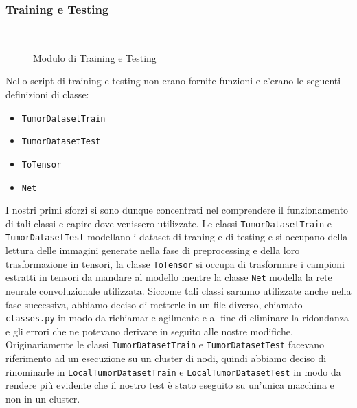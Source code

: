 \subsubsection{Training e Testing} ~\newline
\begin{figure}[hbpt!]
		\centering
		
  		\caption{Modulo di Training e Testing}
        \label{fig:CNN_module}
\end{figure}
Nello script di training e testing non erano fornite funzioni e c'erano le seguenti definizioni di classe:
\begin{itemize}
	\item \texttt{TumorDatasetTrain}
	\item \texttt{TumorDatasetTest}
	\item \texttt{ToTensor}
	\item \texttt{Net}
\end{itemize}
I nostri primi sforzi si sono dunque concentrati nel comprendere il funzionamento di tali classi
e capire dove venissero utilizzate.
Le classi \texttt{TumorDatasetTrain} e \texttt{TumorDatasetTest} modellano i dataset di traning e di testing 
e si occupano della lettura delle immagini generate nella fase di preprocessing e della loro trasformazione in
tensori, la classe \texttt{ToTensor} si occupa di trasformare i campioni estratti in tensori da mandare al modello
mentre la classe \texttt{Net} modella la rete neurale convoluzionale utilizzata. 
Siccome tali classi saranno utilizzate anche nella fase successiva, abbiamo deciso di metterle in un file
diverso, chiamato \texttt{classes.py} in modo da richiamarle agilmente e al fine di eliminare la ridondanza e gli 
errori che ne potevano derivare in seguito alle nostre modifiche. 
Originariamente le classi \texttt{TumorDatasetTrain} e \texttt{TumorDatasetTest} facevano riferimento
ad un esecuzione su un cluster di nodi, quindi abbiamo deciso di rinominarle in \texttt{LocalTumorDatasetTrain} 
e \texttt{LocalTumorDatasetTest} in modo da rendere più evidente che il nostro test è stato eseguito su un'unica
macchina e non in un cluster.

